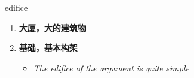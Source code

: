 
\begin{frame}
{\huge edifice}
\begin{center}
\begin{enumerate}\Large
  \item \textbf{大厦，大的建筑物}
  \item \textbf{基础，基本构架}
  \begin{itemize}
    \item \em{\Large{The edifice of the argument is quite simple}}
  \end{itemize}
\end{enumerate}
\end{center}
\end{frame}
